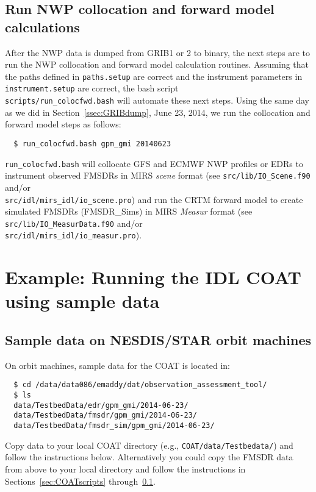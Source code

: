 \documentclass[10pt]{report}
\begin{document}
\subsection{Run NWP collocation and forward model calculations}\label{ssec:scriptNWP}
After the NWP data is dumped from GRIB1 or 2 to binary, the next steps are to run the NWP collocation 
and forward model calculation routines.  Assuming that the paths defined in {\tt paths.setup} are correct and 
the instrument parameters in {\tt instrument.setup} are correct, the bash script \\
{\tt scripts/run\_colocfwd.bash} will automate these next steps.  Using the same day as we did in 
Section~\ref{ssec:GRIBdump}, June 23, 2014, we run the collocation and forward model steps as follows:
\begin{verbatim}
  $ run_colocfwd.bash gpm_gmi 20140623
\end{verbatim}
{\tt run\_colocfwd.bash} will collocate GFS and ECMWF NWP profiles or EDRs to instrument observed FMSDRs 
in MIRS {\it scene} format (see {\tt src/lib/IO\_Scene.f90} and/or \\{\tt src/idl/mirs\_idl/io\_scene.pro}) 
and run the CRTM forward model to create simulated FMSDRs (FMSDR\_Sims) in MIRS {\it Measur} format 
(see {\tt src/lib/IO\_MeasurData.f90} and/or \\{\tt src/idl/mirs\_idl/io\_measur.pro}).

\section{Example: Running the IDL COAT using sample data}\label{sec:IDLCOATEx}

\subsection{Sample data on NESDIS/STAR orbit machines}\label{ssec:OrbitSamp}
On orbit machines, sample data for the COAT is located in:
\begin{verbatim}
  $ cd /data/data086/emaddy/dat/observation_assessment_tool/
  $ ls 
  data/TestbedData/edr/gpm_gmi/2014-06-23/
  data/TestbedData/fmsdr/gpm_gmi/2014-06-23/
  data/TestbedData/fmsdr_sim/gpm_gmi/2014-06-23/
\end{verbatim}
Copy data to your local COAT directory (e.g., {\tt COAT/data/Testbedata/}) and 
follow the instructions below.  Alternatively you could copy the FMSDR data from above to your 
local directory and follow the instructions in Sections~\ref{sec:COATscripts} through~\ref{ssec:scriptNWP}.
\end{document}
